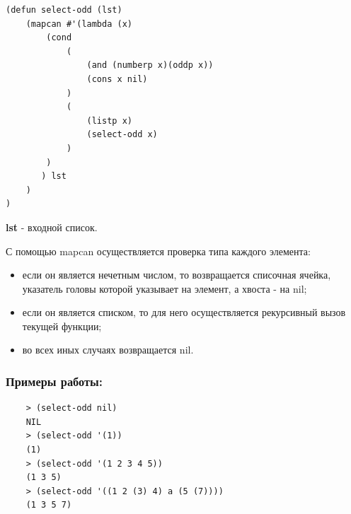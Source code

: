 \documentclass[a4paper, 12pt]{article}
\begin{document}
\begin{lstlisting}[caption=Функция получения всех нечетных чисел из списка]
(defun select-odd (lst)
	(mapcan #'(lambda (x)
		(cond 
			(
				(and (numberp x)(oddp x))
				(cons x nil)
			)
			(
				(listp x)
				(select-odd x)
			)
		)
	   ) lst
	)
)
\end{lstlisting}
\textbf{lst} - входной список.

С помощью mapcan осуществляется проверка типа каждого элемента:
\begin{itemize}
	\item если он является нечетным числом, то возвращается списочная ячейка, указатель головы которой указывает на элемент, а хвоста - на nil;
	\item если он является списком, то для него осуществляется рекурсивный вызов текущей функции;
	\item во всех иных случаях возвращается nil.
\end{itemize}

\subsubsection*{Примеры работы:}
\begin{lstlisting}
	> (select-odd nil)
	NIL
	> (select-odd '(1))
	(1)
	> (select-odd '(1 2 3 4 5))
	(1 3 5)
	> (select-odd '((1 2 (3) 4) a (5 (7))))
	(1 3 5 7)
\end{lstlisting}
\end{document}
